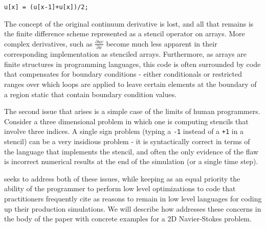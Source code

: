 \begin{verbatim}
u[x] = (u[x-1]+u[x])/2;
\end{verbatim}

The concept of the original continuum derivative is lost, and all that
remains is the finite difference scheme represented as a stencil
operator on arrays.  More complex derivatives, such as $\frac{\partial
  uv}{\partial x}$ become much less apparent in their corresponding
implementation as stenciled arrays.  Furthermore, as arrays are finite
structures in programming languages, this code is often surrounded by
code that compensates for boundary conditions - either conditionals or
restricted ranges over which loops are applied to leave certain
elements at the boundary of a region static that contain boundary
condition values.

The second issue that arises is a simple case of the limits of human
programmers.  Consider a three dimensional problem in which one is
computing stencils that involve three indices.  A single sign problem
(typing a {\tt -1} instead of a {\tt +1} in a stencil) can be a very
insidious problem - it is syntactically correct in terms of the
language that implements the stencil, and often the only evidence of
the flaw is incorrect numerical results at the end of the simulation
(or a single time step).

\FIDDLE seeks to address both of these issues, while keeping as an
equal priority the ability of the programmer to perform low level
optimizations to code that practitioners frequently cite as reasons to
remain in low level languages for coding up their production
simulations.  We will describe how \FIDDLE addresses these concerns in
the body of the paper with concrete examples for a 2D Navier-Stokes
problem.



% 
